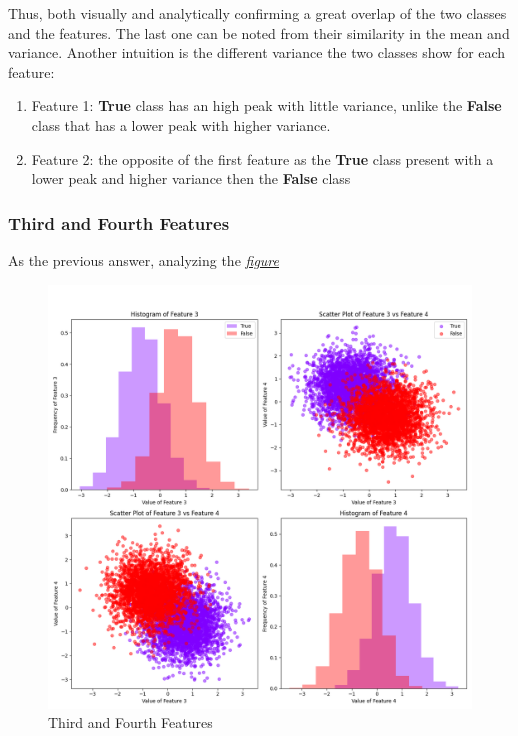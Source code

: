 \documentclass[a4paper, 12pt, english]{article}
\begin{document}
    Thus, both visually and analytically confirming a great overlap of the two classes and the features. The last one can be noted from their similarity in the mean and variance.
    Another intuition is the different variance the two classes show for each feature:
    \begin{enumerate}
        \item Feature 1: \textbf{True} class has an high peak with little variance, unlike the \textbf{False} class that has a lower peak with higher variance.
        \item Feature 2: the opposite of the first feature as the \textbf{True} class present with a lower peak and higher variance then the \textbf{False} class

    \end{enumerate}

    \subsubsection{Third and Fourth Features}\label{project1:2}
    As the previous answer, analyzing the \hyperref[fig:project1_3-4]{\textit{figure}}

    \begin{figure}[h]
        \centering
        \includegraphics[width=0.7\linewidth]{img/projects/project1/3-4.png}
        \caption{Third and Fourth Features}\label{fig:project1_3-4}
    \end{figure}
\end{document}
